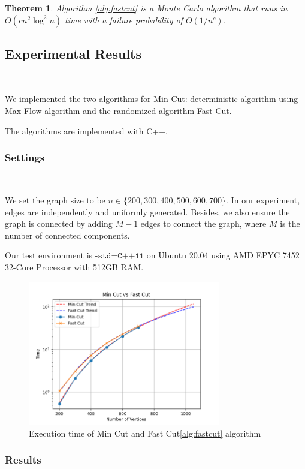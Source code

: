 \documentclass[11pt]{article}
\theoremstyle{plain}
\newtheorem{theorem}{Theorem}[section]
\begin{document}
\begin{theorem}
    Algorithm \ref{alg:fastcut} is a Monte Carlo algorithm that runs in $O(cn^2\log^2 n)$ time with a failure probability of $O(1/n^c)$.
\end{theorem}

\subsection{Experimental Results}\

We implemented the two algorithms for Min Cut: deterministic algorithm using Max Flow algorithm and the randomized algorithm Fast Cut.

The algorithms are implemented with C++.

\subsubsection{Settings}\

We set the graph size to be $n\in\{200,300,400,500,600,700\}$. In our experiment, edges are independently and uniformly generated. Besides, we also ensure the graph is connected by adding $M-1$ edges to connect the graph, where $M$ is the number of connected components.

Our test environment is $\texttt{-std=C++11}$ on Ubuntu 20.04 using AMD EPYC 7452 32-Core Processor with 512GB RAM.

\begin{figure}[ht]
    \centering
    \includegraphics[width=0.75\textwidth]{../MinCut/MinCut.png}
    \caption{Execution time of Min Cut and Fast Cut\ref{alg:fastcut} algorithm}
    \label{fig:mc}
\end{figure}

\subsubsection{Results}\
\end{document}
